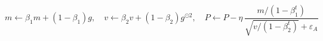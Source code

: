 \documentclass{article}
\begin{document}
\begin{preview}

\[ m \leftarrow \beta_1 m + (1-\beta_1) g,\quad v \leftarrow \beta_2 v + (1-\beta_2) g^{\odot 2},\quad P \leftarrow P - \eta\,\dfrac{m/(1-\beta_1^t)}{\sqrt{v/(1-\beta_2^t)} + \varepsilon_A} \]

\end{preview}
\end{document}
